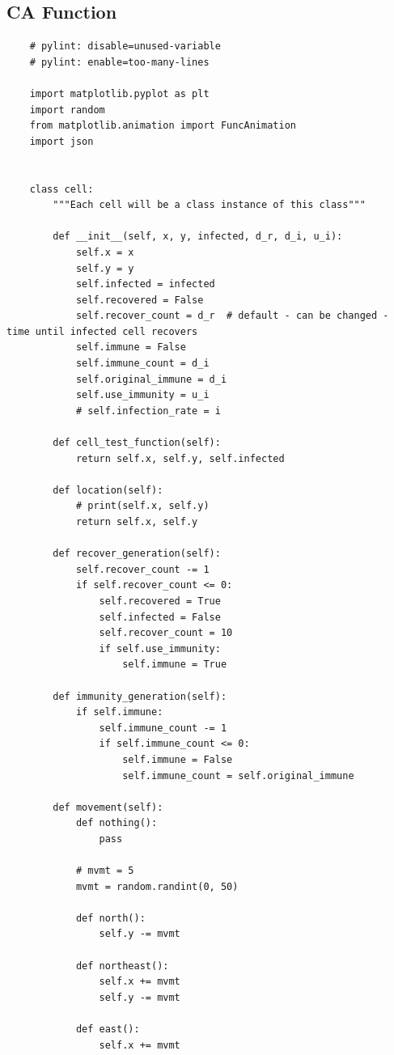 \documentclass[11pt, a4paper]{article}
\begin{document}
\subsection{CA Function}
\begin{lstlisting}
    # pylint: disable=unused-variable
    # pylint: enable=too-many-lines
    
    import matplotlib.pyplot as plt
    import random
    from matplotlib.animation import FuncAnimation
    import json
    
    
    class cell:
        """Each cell will be a class instance of this class"""
    
        def __init__(self, x, y, infected, d_r, d_i, u_i):
            self.x = x
            self.y = y
            self.infected = infected
            self.recovered = False
            self.recover_count = d_r  # default - can be changed - time until infected cell recovers
            self.immune = False
            self.immune_count = d_i
            self.original_immune = d_i
            self.use_immunity = u_i
            # self.infection_rate = i
    
        def cell_test_function(self):
            return self.x, self.y, self.infected
    
        def location(self):
            # print(self.x, self.y)
            return self.x, self.y
    
        def recover_generation(self):
            self.recover_count -= 1
            if self.recover_count <= 0:
                self.recovered = True
                self.infected = False
                self.recover_count = 10
                if self.use_immunity:
                    self.immune = True
    
        def immunity_generation(self):
            if self.immune:
                self.immune_count -= 1
                if self.immune_count <= 0:
                    self.immune = False
                    self.immune_count = self.original_immune
    
        def movement(self):
            def nothing():
                pass
    
            # mvmt = 5
            mvmt = random.randint(0, 50)
    
            def north():
                self.y -= mvmt
    
            def northeast():
                self.x += mvmt
                self.y -= mvmt
    
            def east():
                self.x += mvmt
    

\end{lstlisting}
\end{document}
